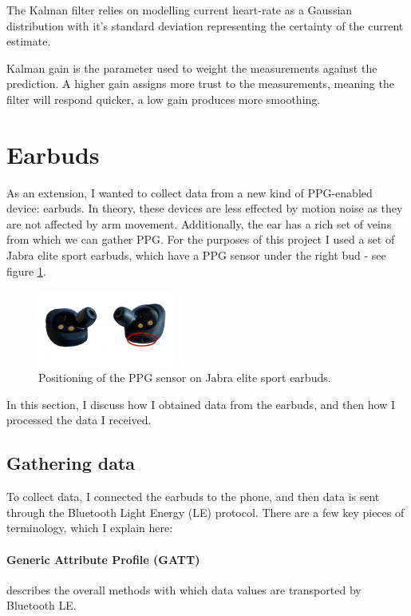 \documentclass[12pt,a4paper,twoside,openright]{report}
\begin{document}
The Kalman filter relies on modelling current heart-rate as a Gaussian
distribution with it's standard deviation representing the certainty of the
current estimate.

Kalman gain is the parameter used to weight the measurements against the
prediction. A higher gain assigns more trust to the measurements, meaning the
filter will respond quicker, a low gain produces more smoothing.



\section{Earbuds}

As an extension, I wanted to collect data from a new kind of PPG-enabled
device: earbuds. In theory, these devices are less effected by motion noise
as they are not affected by arm movement. Additionally, the ear has a rich set
of veins from which we can gather PPG. For the purposes of this project I used
a set of Jabra elite sport earbuds, which have a PPG sensor under the right
bud - see figure \ref{fig:jabra}.

\begin{figure}[tbh]
	\centerline{\includegraphics[width=0.4\textwidth]{figs/jabra.png}}
	\caption{Positioning of the PPG sensor on Jabra elite sport earbuds.}
	\label{fig:jabra}
\end{figure}

In this section, I discuss how I obtained data from the earbuds, and then how
I processed the data I received. 

\subsection{Gathering data}

To collect data, I connected the earbuds to the phone, and then data is
sent through the Bluetooth Light Energy (LE) protocol. There are a few key
pieces of terminology, which I explain here:

\paragraph{Generic Attribute Profile (GATT)} describes the overall methods
with which data values are transported by Bluetooth LE.
\end{document}
